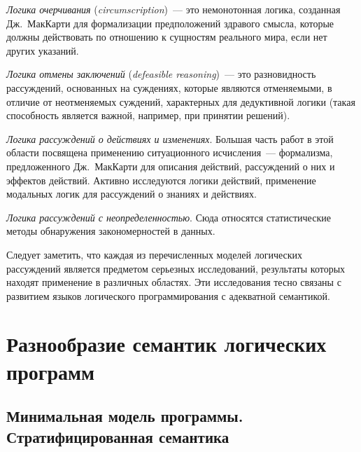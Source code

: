 \begin{multicols}{2}
\textit{Логика очерчивания} (\textit{circumscription})~--- это немонотонная логика, созданная 
Дж.~МакКарти для формализации предположений здравого смысла, которые должны 
действовать по отношению к сущностям реального мира, если нет других указаний.

\textit{Логика отмены заключений} (\textit{defeasible reasoning})~--- это разновидность 
рассуждений, основанных на суждениях, которые являются отменяемыми, в отличие от 
неотменяемых суждений, характерных для дедуктивной логики (такая способность 
является важной, например, при принятии решений).

\textit{Логика рассуждений о действиях и изменениях}. Большая часть работ в этой области 
посвящена применению ситуационного исчисления~--- формализма, предложенного 
Дж.~МакКарти для описания действий, рассуждений о них и эффектов действий. Активно 
исследуются логики действий, применение модальных логик для рассуждений о знаниях и 
действиях.

\textit{Логика рассуждений с неопределенностью}. Сюда относятся статистические методы 
обнаружения закономерностей в данных.

Следует заметить, что каждая из перечисленных моделей логических рассуждений является 
предметом серьезных исследований, результаты которых находят применение в различных 
областях. Эти исследования тесно связаны с развитием языков логического 
программирования с адекватной семантикой.

\vspace*{-8pt}

\section{Разнообразие семантик логических программ}

\vspace*{-3pt}
   
   \subsection{Минимальная модель программы. Стратифицированная семантика} %
   
   \vspace*{-1pt}


\end{multicols}
